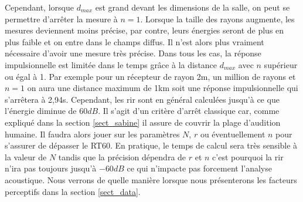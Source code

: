 Cependant, lorsque $d_{max}$ est grand devant les dimensions de la salle, on peut se permettre d'arrêter la mesure à $n=1$. Lorsque la taille des rayons augmente, les mesures deviennent moins précise, par contre, leurs énergies seront de plus en plus faible et on entre dans le champs diffus. Il n'est alors plus vraiment nécessaire d'avoir une mesure très précise. Dans tous les cas, la réponse impulsionnelle est limitée dans le temps grâce à la distance $d_{max}$ avec $n$ supérieur ou égal à 1. Par exemple pour un récepteur de rayon 2m, un million de rayons et $n=1$ on aura une distance maximum de 1km soit une réponse impulsionnelle qui s'arrêtera à 2,94s. Cependant, les \gls{rir} sont en général calculées jusqu'à ce que l'énergie diminue de $60dB$. Il s'agit d'un critère d'arrêt classique car, comme expliqué dans la section \ref{sect_sabine} il assure de couvrir la plage d'audition humaine. Il faudra alors jouer sur les paramètres $N$, $r$ ou éventuellement $n$ pour s'assurer de dépasser le \gls{RT60}. En pratique, le temps de calcul sera très sensible à la valeur de $N$ tandis que la précision dépendra de $r$ et $n$ c'est pourquoi la \gls{rir} n'ira pas toujours jusqu'à $-60dB$ ce qui n'impacte pas forcement l'analyse acoustique. Nous verrons de quelle manière lorsque nous présenterons les facteurs perceptifs dans la section \ref{sect_data}.















